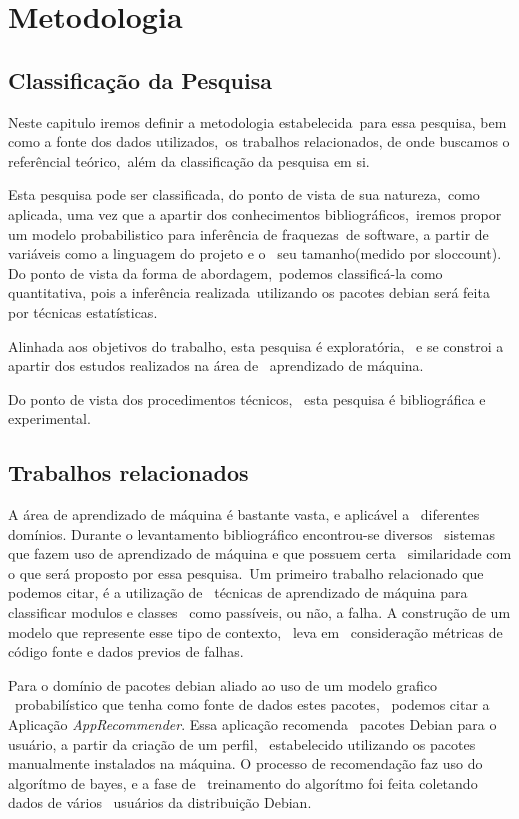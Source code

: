 \chapter{Metodologia}

\section{Classificação da Pesquisa}

Neste capitulo iremos definir a metodologia estabelecida\ 
para essa pesquisa, bem como a fonte dos dados utilizados,\ 
os trabalhos relacionados, de onde buscamos o referêncial teórico,\
além da classificação da pesquisa em si.

Esta pesquisa pode ser classificada, do ponto de vista de sua natureza,\ 
como aplicada, uma vez que a apartir dos conhecimentos bibliográficos,\
iremos propor um modelo probabilistico para inferência de fraquezas\
de software, a partir de variáveis como a linguagem do projeto e o \
seu tamanho(medido por sloccount). Do ponto de vista da forma de abordagem,\
podemos classificá-la como quantitativa, pois a inferência realizada\ 
utilizando os pacotes debian será feita por técnicas estatísticas.

Alinhada aos objetivos do trabalho, esta pesquisa é exploratória, \ 
e se constroi a apartir dos estudos realizados na área de \ 
aprendizado de máquina.

Do ponto de vista dos procedimentos técnicos, \ 
esta pesquisa é bibliográfica e experimental.

\section{Trabalhos relacionados}

A área de aprendizado de máquina é bastante vasta, e aplicável a \ 
diferentes domínios.
Durante o levantamento bibliográfico encontrou-se diversos \ 
sistemas que fazem uso de aprendizado de máquina e que possuem certa \ 
similaridade com o que será proposto por essa pesquisa.\
Um primeiro trabalho relacionado que podemos citar, é a utilização de \ 
técnicas de aprendizado de máquina para classificar modulos e classes \ 
como passíveis, ou não, a falha\cite{Malhotra}.
A construção de um modelo que represente esse tipo de contexto, \ leva em \ 
consideração métricas de código fonte e dados previos de falhas\cite{Malhotra}.

Para o domínio de pacotes debian aliado ao uso de um modelo grafico \ 
probabilístico que tenha como fonte de dados estes pacotes, \ 
podemos citar a Aplicação \textit{AppRecommender}. Essa aplicação recomenda \ 
pacotes Debian para o usuário, a partir da criação de um perfil, \ 
estabelecido utilizando os pacotes manualmente instalados na máquina.
O processo de recomendação faz uso do algorítmo de bayes, e a fase de \ 
treinamento do algorítmo foi feita coletando dados de vários \ 
usuários da distribuição Debian.

